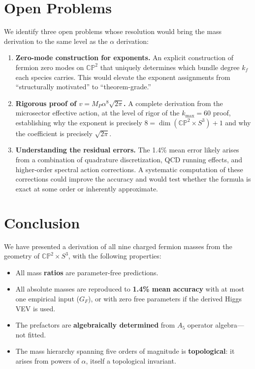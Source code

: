 \documentclass[11pt,a4paper]{article}
\newcommand{\CP}{\mathbb{CP}}
\theoremstyle{definition}
\theoremstyle{remark}
\begin{document}
\section{Open Problems}
\label{sec:open}

We identify three open problems whose resolution would bring the
mass derivation to the same level as the $\alpha$ derivation:

\begin{enumerate}
\item \textbf{Zero-mode construction for exponents.}
  An explicit construction of fermion zero modes on $\CP^2$ that
  uniquely determines which bundle degree $k_f$ each species carries.
  This would elevate the exponent assignments from ``structurally
  motivated'' to ``theorem-grade.''

\item \textbf{Rigorous proof of $v = M_P\alpha^8\sqrt{2\pi}$.}
  A complete derivation from the microsector effective action,
  at the level of rigor of the $k_{\max} = 60$ proof, establishing
  why the exponent is precisely $8 = \dim(\CP^2\times S^3) + 1$ and
  why the coefficient is precisely $\sqrt{2\pi}$.

\item \textbf{Understanding the residual errors.}
  The 1.4\% mean error likely arises from a combination of
  quadrature discretization, QCD running effects, and higher-order
  spectral action corrections.
  A systematic computation of these corrections could improve
  the accuracy and would test whether the formula is exact at some
  order or inherently approximate.
\end{enumerate}

\section{Conclusion}
\label{sec:conclusion}

We have presented a derivation of all nine charged fermion masses
from the geometry of $\CP^2\times S^3$, with the following
properties:

\begin{itemize}
\item All mass \textbf{ratios} are parameter-free predictions.
\item All absolute masses are reproduced to \textbf{1.4\% mean accuracy}
  with at most one empirical input ($G_F$), or with zero free
  parameters if the derived Higgs VEV is used.
\item The prefactors are \textbf{algebraically determined} from $A_5$
  operator algebra---not fitted.
\item The mass hierarchy spanning five orders of magnitude is
  \textbf{topological}: it arises from powers of $\alpha$, itself
  a topological invariant.
\end{itemize}
\end{document}

